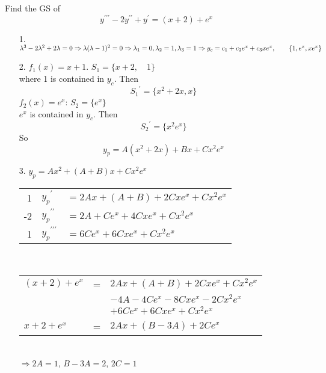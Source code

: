\documentclass[11pt]{amsbook}
\begin{document}
\begin{exmp}
	Find the GS of
	\[
	y^{\prime\prime\prime}-2y^{\prime\prime}+y^{\prime}=(x+2)+e^x
	\]

\begin{hSolution}
\begin{enumerate}
	\item[1.]
	$\lambda^3-2\lambda^2+2\lambda = 0  \Rightarrow \lambda(\lambda-1)^2=0 \Rightarrow  \lambda_1=0, \lambda_2=1, \lambda_3=1\\
	\Rightarrow y_c = c_1 + c_2 e^x+c_3 x e^x, \qquad \{1, e^x,xe^x\}$
	\item[2.]
	\underline{$f_1(x)=x+1$}. $S_1=\{x+2,\quad1\}$\\
	where 1 is contained in $y_c$. Then
	\[
	{S_1}^\prime = \{x^2+2x,x\}
	\]
	\underline{$f_2(x)=e^x$}: $S_2=\{e^x\}$\\
	$e^x$ is contained in $y_c$. Then
	\[
	{S_2}^\prime = \{x^2 e^x\}
	\]
	So
	\[
	y_p=A(x^2+2x)+Bx+Cx^2 e^x
	\]
	\item[3.] 
		$y_p=Ax^2+(A+B)x+Cx^2e^x$\\
		\begin{tabular}{r|l l}
		1 & ${y_p}^{\prime}$ &$= 2Ax +(A+B)+2Cxe^x+Cx^2e^x$\\
		-2 & $ {y_p}^{\prime\prime}$ &$= 2A + Ce^x + 4Cxe^x + Cx^2e^x$\\
		1 & ${y_p}^{\prime\prime\prime}$ &$= 6C e^x + 6Cxe^x + Cx^2e^x$

		\end{tabular}\\
		\begin{tabular}{lll}
		$(x+2)+e^x $ & = & $2Ax+(A+B) + 2Cxe^x + Cx^2e^x$\\
		&&$-4A - 4C e^x - 8Cxe^x - 2Cx^2e^x$\\
		&&$+6Ce^x+6Cxe^x+Cx^2e^x$\\
		$x+2+e^x$ & = & $2Ax + (B-3A) + 2Ce^x$\\
		\end{tabular}\\
$\Rightarrow$\quad $2A=1$, \quad $B-3A=2$, \quad $2C=1$
\end{enumerate}
\end{hSolution}
\end{exmp}
\end{document}
